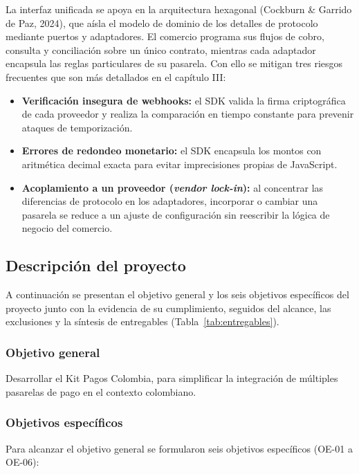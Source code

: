 La interfaz unificada se apoya en la arquitectura hexagonal (Cockburn \& Garrido de Paz, 2024), que aísla el modelo de dominio de los detalles de protocolo mediante puertos y adaptadores. El comercio programa sus flujos de cobro, consulta y conciliación sobre un único contrato, mientras cada adaptador encapsula las reglas particulares de su pasarela. Con ello se mitigan tres riesgos frecuentes que son más detallados en el capítulo III:
\begin{itemize}
    \item \textbf{Verificación insegura de webhooks:} el SDK valida la firma criptográfica de cada proveedor y realiza la comparación en tiempo constante para prevenir ataques de temporización.
    \item \textbf{Errores de redondeo monetario:} el SDK encapsula los montos con aritmética decimal exacta para evitar imprecisiones propias de JavaScript.
    \item \textbf{Acoplamiento a un proveedor (\textit{vendor lock-in}):} al concentrar las diferencias de protocolo en los adaptadores, incorporar o cambiar una pasarela se reduce a un ajuste de configuración sin reescribir la lógica de negocio del comercio.
\end{itemize}

\subsection{Descripción del proyecto}

A continuación se presentan el objetivo general y los seis objetivos específicos del proyecto junto con la evidencia de su cumplimiento, seguidos del alcance, las exclusiones y la síntesis de entregables (Tabla~\ref{tab:entregables}).

\subsubsection{Objetivo general}
Desarrollar el Kit Pagos Colombia, para simplificar la integración de múltiples pasarelas de pago en el contexto colombiano.

\subsubsection{Objetivos específicos}
Para alcanzar el objetivo general se formularon seis objetivos específicos (OE-01 a OE-06):

